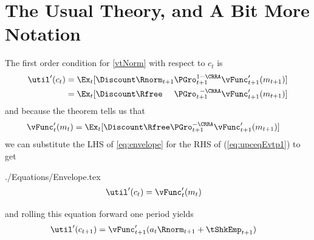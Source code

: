 \documentclass[titlepage]{\econtex}
\begin{document}
\hypertarget{The-Usual-Theory}{}
\section{The Usual Theory, and A Bit More Notation}
\label{sec:usualtheory}


The first order condition for \eqref{vtNorm} with respect to ${c}_{t}$ is
\begin{equation}\begin{gathered}\begin{aligned}
  \util^{\prime}({c}_{t})  & = \Ex_{t}[\Discount \Rnorm_{t+1}\PGro_{t+1}^{1-\CRRA}\null{\vFunc}^{\prime}_{t+1}({m}_{t+1})]  \nonumber 
  \\   & =  \Ex_{t}[\Discount\Rfree\phantom{_{t+1}}\PGro_{t+1}^{\phantom{1}-\CRRA}\null{\vFunc}^{\prime}_{t+1}({m}_{t+1})] \label{eq:upceqEvtp1}
\end{aligned}\end{gathered}\end{equation}
and because the  theorem tells us that
\begin{equation}\begin{gathered}\begin{aligned}
  \null{\vFunc}^{\prime}_{t}({m}_{t})  & =  \Ex_{t} [\Discount\Rfree\PGro_{t+1}^{-\CRRA}\null{\vFunc}^{\prime}_{t+1}({m}_{t+1})] \label{eq:envelope}
\end{aligned}\end{gathered}\end{equation}
we can substitute the LHS of \eqref{eq:envelope} for the RHS of
(\ref{eq:upceqEvtp1}) to get
\begin{verbatimwrite}{./Equations/Envelope.tex}
  \begin{equation}\begin{gathered}\begin{aligned}
    \util^{\prime}({c}_{t})  & = \null{\vFunc}^{\prime}_{t}({m}_{t})\label{eq:Envelope}
  \end{aligned}\end{gathered}\end{equation}
\end{verbatimwrite}

and rolling this equation forward one period yields
\begin{equation}\begin{gathered}\begin{aligned}
  \util^{\prime}({c}_{t+1})  & = \null{\vFunc}^{\prime}_{t+1}({a}_{t}\Rnorm_{t+1}+\tShkEmp_{t+1}) \label{eq:upctp1EqVpxtp1}
\end{aligned}\end{gathered}\end{equation}
\end{document}
